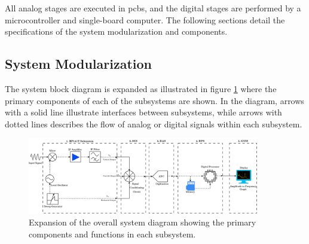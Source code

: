 \documentclass[class=report,11pt,crop=false]{standalone}
\begin{document}
	All analog stages are executed in \acrshort{pcb}s, and the digital stages are performed by a microcontroller and single-board computer. The following sections detail the specifications of the system modularization and components.

	\subsection{System Modularization}
	
	The system block diagram is expanded as illustrated in figure \ref{fig:system-block-diagram} where the primary components of each of the subsystems are shown. In the diagram, arrows with a solid line illustrate interfaces between subsystems, while arrows with dotted lines describes the flow of analog or digital signals within each subsystem.  
	\begin{figure}
		\centering
		\includegraphics[width=0.90\textwidth]{Figures/Methodology/system-block-diagram}
		\caption{Expansion of the overall system diagram showing the primary components and functions in each subsystem.}
		\label{fig:system-block-diagram}
	\end{figure}
\end{document}
